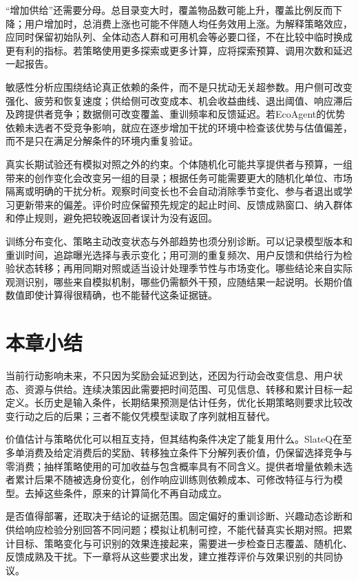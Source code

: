 “增加供给”还需要分母。总目录变大时，覆盖物品数可能上升，覆盖比例反而下降；用户增加时，总消费上涨也可能不伴随人均任务效用上涨。为解释策略效应，应同时保留初始队列、全体动态人群和可用机会等必要口径，不在比较中临时换成更有利的指标。若策略使用更多探索或更多计算，应将探索预算、调用次数和延迟一起报告。

敏感性分析应围绕结论真正依赖的条件，而不是只扰动无关超参数。用户侧可改变强化、疲劳和恢复速度；供给侧可改变成本、机会收益曲线、退出阈值、响应滞后及跨提供者竞争；数据侧可改变覆盖、重训频率和反馈延迟。若EcoAgent的优势依赖未选者不受竞争影响，就应在逐步增加干扰的环境中检查该优势与估值偏差，而不是只在满足分解条件的环境内重复验证。

真实长期试验还有模拟对照之外的约束。个体随机化可能共享提供者与预算，一组带来的创作变化会改变另一组的目录；根据任务可能需要更大的随机化单位、市场隔离或明确的干扰分析。观察时间变长也不会自动消除季节变化、参与者退出或学习更新带来的偏差。评价时应保留预先规定的起止时间、反馈成熟窗口、纳入群体和停止规则，避免把较晚返回者误计为没有返回。

训练分布变化、策略主动改变状态与外部趋势也须分别诊断。可以记录模型版本和重训时间，追踪曝光选择与表示变化；用可测的重复频次、用户反馈和供给行为检验状态转移；再用同期对照或适当设计处理季节性与市场变化。哪些结论来自实际观测识别，哪些来自模拟机制，哪些仍需额外干预，应随结果一起说明。长期价值数值即使计算得很精确，也不能替代这条证据链。

\section{本章小结}
\label{sec:rs-long-term-summary}

当前行动影响未来，不只因为奖励会延迟到达，还因为行动会改变信息、用户状态、资源与供给。连续决策因此需要把时间范围、可见信息、转移和累计目标一起定义。长历史是输入条件，长期结果预测是估计任务，优化长期策略则要求比较改变行动之后的后果；三者不能仅凭模型读取了序列就相互替代。

价值估计与策略优化可以相互支持，但其结构条件决定了能复用什么。SlateQ在至多单消费及给定消费后的奖励、转移独立条件下分解列表价值，仍保留选择竞争与零消费；抽样策略使用的可加收益与包含概率具有不同含义。提供者增量依赖未选者累计后果不随被选身份变化，创作响应训练则依赖成本、可修改特征与行为模型。去掉这些条件，原来的计算简化不再自动成立。

是否值得部署，还取决于结论的证据范围。固定偏好的重训诊断、兴趣动态诊断和供给响应检验分别回答不同问题；模拟让机制可控，不能代替真实长期对照。把累计目标、策略变化与可识别的效果连接起来，需要进一步检查日志覆盖、随机化、反馈成熟及干扰。下一章将从这些要求出发，建立推荐评价与效果识别的共同协议。

